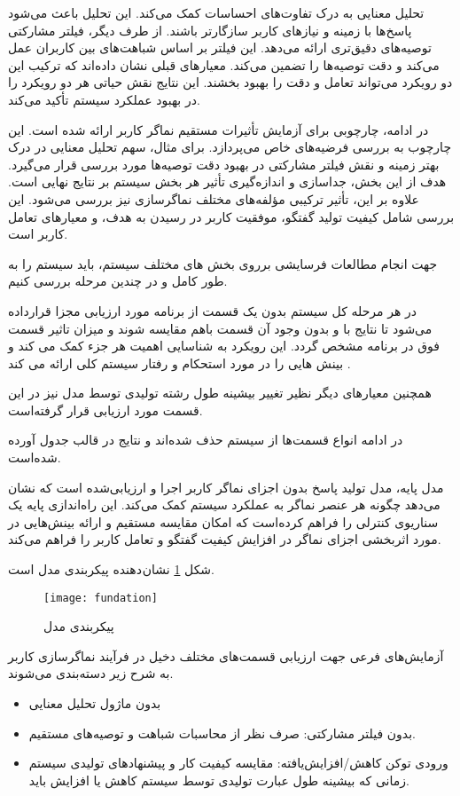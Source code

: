 تحلیل معنایی به درک تفاوت‌های احساسات کمک می‌کند. این تحلیل باعث می‌شود پاسخ‌ها با زمینه و نیازهای کاربر سازگارتر باشند. از طرف دیگر، فیلتر مشارکتی توصیه‌های دقیق‌تری ارائه می‌دهد. این فیلتر بر اساس شباهت‌های بین کاربران عمل می‌کند و دقت توصیه‌ها را تضمین می‌کند.
معیارهای قبلی نشان داده‌اند که ترکیب این دو رویکرد می‌تواند تعامل و دقت را بهبود بخشند. این نتایج نقش حیاتی هر دو رویکرد را در بهبود عملکرد سیستم تأکید می‌کند.

در ادامه، چارچوبی برای آزمایش تأثیرات مستقیم نماگر کاربر ارائه شده است. این چارچوب به بررسی فرضیه‌های خاص می‌پردازد. برای مثال، سهم تحلیل معنایی در درک بهتر زمینه و نقش فیلتر مشارکتی در بهبود دقت توصیه‌ها مورد بررسی قرار می‌گیرد.
هدف از این بخش، جداسازی و اندازه‌گیری تأثیر هر بخش سیستم بر نتایج نهایی است. علاوه بر این، تأثیر ترکیبی مؤلفه‌های مختلف نماگر‌سازی نیز بررسی می‌شود. این بررسی شامل کیفیت تولید گفتگو، موفقیت کاربر در رسیدن به هدف، و معیارهای تعامل کاربر است.

جهت انجام مطالعات فرسایشی%
 برروی بخش های مختلف سیستم، باید سیستم را به طور کامل و در چندین مرحله بررسی کنیم.

در هر مرحله کل سیستم بدون یک قسمت از برنامه مورد ارزیابی مجزا قرارداده می‌شود تا نتایج با و بدون وجود آن قسمت باهم مقایسه شوند و میزان تاثیر قسمت فوق در برنامه مشخص گردد. این رویکرد به شناسایی اهمیت هر جزء کمک می کند و بینش هایی را در مورد استحکام و رفتار سیستم کلی ارائه می کند %
\cite{na2024scalable}
.

همچنین معیارهای دیگر نظیر تغییر بیشینه طول رشته تولیدی توسط مدل نیز در این قسمت مورد ارزیابی قرار گرفته‌است.

در ادامه انواع قسمت‌ها از سیستم حذف شده‌اند و نتایج در قالب جدول آورده شده‌است.


مدل پایه، مدل تولید پاسخ بدون اجزای نماگر کاربر اجرا و ارزیابی‌شده است که نشان می‌د‌هد چگونه هر عنصر نماگر به عملکرد سیستم کمک می‌کند. این راه‌اندازی پایه یک سناریوی کنترلی را فراهم کرده‌است که امکان مقایسه مستقیم و ارائه بینش‌هایی در مورد اثربخشی اجزای نماگر در افزایش کیفیت گفتگو و تعامل کاربر را فراهم می‌کند.

شکل%
\ref{fig:fundation}
نشان دهنده پیکربندی مدل است.


\begin{figure}[ht]
	\centerline{\texttt{[image: fundation]}}
	\caption{پیکربندی مدل}
	\label{fig:fundation}
\end{figure}

آزمایش‌های فرعی جهت ارزیابی قسمت‌های مختلف دخیل در فرآیند نماگر‌سازی کاربر به شرح زیر دسته‌بندی می‌شوند.
\begin{itemize}
\item
بدون ماژول تحلیل معنایی
\item
بدون فیلتر مشارکتی: صرف نظر از محاسبات شباهت و توصیه‌های مستقیم.
\item
ورودی توکن کاهش/افزایش‌یافته: مقایسه کیفیت کار و پیشنهادهای تولیدی سیستم زمانی که بیشینه طول عبارت تولیدی توسط سیستم کاهش یا افزایش باید.
\end{itemize}

